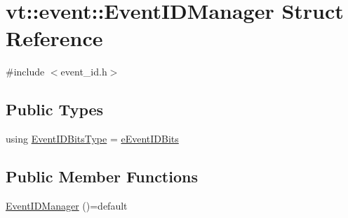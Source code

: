 \hypertarget{structvt_1_1event_1_1_event_i_d_manager}{}\section{vt\+:\+:event\+:\+:Event\+I\+D\+Manager Struct Reference}
\label{structvt_1_1event_1_1_event_i_d_manager}


{\ttfamily \#include $<$event\+\_\+id.\+h$>$}

\subsection*{Public Types}
\begin{DoxyCompactItemize}
\item 
using \hyperlink{structvt_1_1event_1_1_event_i_d_manager_a24c0cbdfa3e28c477d3f7010c6cba7e2}{Event\+I\+D\+Bits\+Type} = \hyperlink{namespacevt_1_1event_ad563011dc9e3e01042df27d00092aceb}{e\+Event\+I\+D\+Bits}
\end{DoxyCompactItemize}
\subsection*{Public Member Functions}
\begin{DoxyCompactItemize}
\item 
\hyperlink{structvt_1_1event_1_1_event_i_d_manager_abbd9a6951ee83b42bd24a8399952b721}{Event\+I\+D\+Manager} ()=default
\end{DoxyCompactItemize}
